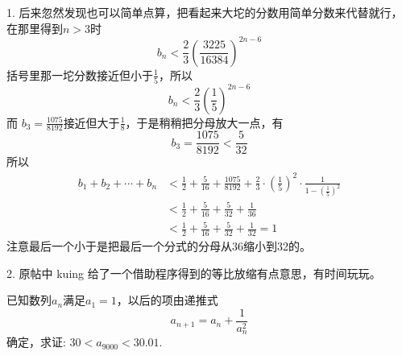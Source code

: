 \begin{exerciseAdditional}
1. 后来忽然发现也可以简单点算，把看起来大坨的分数用简单分数来代替就行，在那里得到$n>3$时
\[ b_n < \frac{2}{3} \left( \frac{3225}{16384} \right)^{2n-6} \]
括号里那一坨分数接近但小于$\frac{1}{5}$，所以
\[ b_n < \frac{2}{3} \left( \frac{1}{5} \right)^{2n-6} \]
而 $b_3=\frac{1075}{8192} $接近但大于$\frac{1}{8}$，于是稍稍把分母放大一点，有
\[ b_3=\frac{1075}{8192}<\frac{5}{32}  \]
所以
\begin{align*}
b_1+b_2+\cdots+b_n & < \frac{1}{2}+\frac{5}{16} + \frac{1075}{8192} + \frac{2}{3} \cdot \left( \frac{1}{5} \right)^2 \cdot \frac{1}{1-\left( \frac{1}{5} \right)^2} \\
& < \frac{1}{2}+\frac{5}{16} + \frac{5}{32} + \frac{1}{36} \\
& < \frac{1}{2}+\frac{5}{16} + \frac{5}{32} + \frac{1}{32} = 1
\end{align*}
注意最后一个小于是把最后一个分式的分母从36缩小到32的。

2. 原帖中 kuing 给了一个借助程序得到的等比放缩有点意思，有时间玩玩。
\end{exerciseAdditional}

\begin{exercise}
  已知数列$a_n$满足$a_1=1$，以后的项由递推式
  \[ a_{n+1} = a_n + \frac{1}{a_n^2} \]
  确定，求证: $30 < a_{9000} < 30.01$.
\end{exercise}

